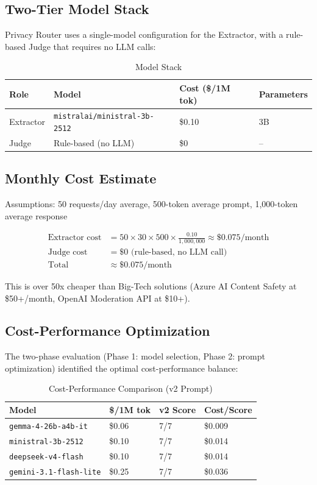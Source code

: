 \documentclass[11pt,a4paper]{article}
\begin{document}
\subsection{Two-Tier Model Stack}

Privacy Router uses a single-model configuration for the Extractor, with a rule-based Judge that requires no LLM calls:

\begin{table}[h]
\centering
\begin{tabular}{@{}llll@{}}
\toprule
Role & Model & Cost (\$/1M tok) & Parameters \\
\midrule
Extractor & \texttt{mistralai/ministral-3b-2512} & \$0.10 & 3B \\
Judge & Rule-based (no LLM) & \$0 & -- \\
\bottomrule
\end{tabular}
\caption{Model Stack}
\end{table}

\subsection{Monthly Cost Estimate}

Assumptions: 50 requests/day average, 500-token average prompt, 1,000-token average response

\begin{align*}
\text{Extractor cost} &= 50 \times 30 \times 500 \times \frac{0.10}{1{,}000{,}000} \approx \$0.075/\text{month} \\
\text{Judge cost} &= \$0 \text{ (rule-based, no LLM call)} \\
\text{Total} &\approx \$0.075/\text{month}
\end{align*}

This is over 50x cheaper than Big-Tech solutions (Azure AI Content Safety at \$50+/month, OpenAI Moderation API at \$10+).

\subsection{Cost-Performance Optimization}

The two-phase evaluation (Phase 1: model selection, Phase 2: prompt optimization) identified the optimal cost-performance balance:

\begin{table}[h]
\centering
\begin{tabular}{@{}llll@{}}
\toprule
Model & \$/1M tok & v2 Score & Cost/Score \\
\midrule
\texttt{gemma-4-26b-a4b-it} & \$0.06 & 7/7 & \$0.009 \\
\texttt{ministral-3b-2512} & \$0.10 & 7/7 & \$0.014 \\
\texttt{deepseek-v4-flash} & \$0.10 & 7/7 & \$0.014 \\
\texttt{gemini-3.1-flash-lite} & \$0.25 & 7/7 & \$0.036 \\
\bottomrule
\end{tabular}
\caption{Cost-Performance Comparison (v2 Prompt)}
\end{table}
\end{document}
